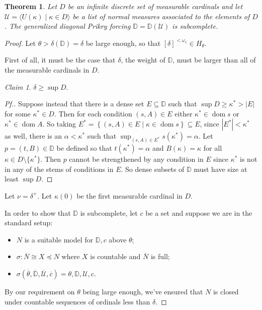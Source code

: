 \documentclass{amsart}
\newtheorem{theorem}{Theorem}[section]
\theoremstyle{definition}
\theoremstyle{remark}
\newtheorem{claimno}{Claim}
\newcommand{\D}{\mathbb{D}}
\newcommand{\N}{{\overline{N}}}
\newcommand{\U}{\mathcal{U}}
\DeclareMathOperator{\otp}{otp}
\DeclareMathOperator{\dom}{dom}
\newcommand{\st}{\; | \;}
\newcommand{\set}[2]{\left\{#1\st #2 \right\}}
\newcommand{\seq}[2]{\langle #1 \st #2 \rangle}
\begin{document}
\begin{theorem} Let $D$ be an infinite discrete set of measurable cardinals %
and let $\U = \seq{ U(\kappa) }{\kappa \in D }$ be a list of normal measures associated to the
elements of $D$. 
The generalized diagonal Prikry forcing $\D=\D(\U)$ is subcomplete. \end{theorem}
\begin{proof} 
Let $\theta > \delta(\D) =\delta$ be large enough, so that $[\delta]^{<\omega_1} \in H_\theta$. 

First of all, it must be the case that $\delta$, the weight of $\D$, must be larger than all of the measurable cardinals in $D$.
\begin{claimno} $\delta \geq \sup D$. \end{claimno}
\begin{proof}[Pf.] Suppose instead that there is a dense set $E \subseteq \D$ such that $\sup D \geq \kappa^* >|E|$ for some $\kappa^* \in D$. Then for each condition $(s,A) \in E$ either $\kappa^* \in \dom s$ or $\kappa^* \in \dom A$. So taking $E^*=\set{ (s, A) \in E }{ \kappa \in \dom s } \subseteq E$, since $|E^*| < \kappa^*$ as well, there is an $\alpha<\kappa^*$ such that $\sup_{(s,A) \in E^*} s(\kappa^*)=\alpha$. Let $p=(t, B) \in \D$ be defined so that $t(\kappa^*)=\alpha$ and $B(\kappa)=\kappa$ for all $\kappa \in D \setminus \{ \kappa^*\}$. Then $p$ cannot be strengthened by any condition in $E$ since $\kappa^*$ is not in any of the stems of conditions in $E$. So dense subsets of $\D$ must have size at least $\sup D$.\end{proof}

Let $\nu = \delta^+$. Let $\kappa(0)$ be the first measurable cardinal in $D$. %

In order to show that $\D$ is subcomplete, let $c$ be a set and suppose we are in the standard setup: \begin{itemize}
	\item $N$ is a suitable model for $\D, c$ above $\theta$;
	\item $\sigma: \N \cong X \preccurlyeq N$ where $X$ is countable and $\N$ is full;
	\item $\sigma(\overline \theta, \overline{\D}, \overline{\U}, \overline c)=\theta, \D, \U, c$.
\end{itemize}
By our requirement on $\theta$ being large enough, we've ensured that $N$ is closed under countable sequences of ordinals less than $\delta$.


\end{proof}
\end{document}
